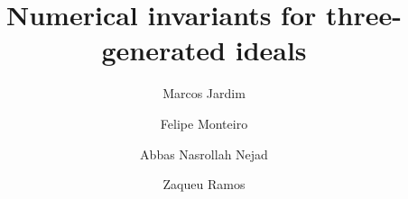 \documentclass[11pt]{amsart} %
\theoremstyle{definition}
\begin{document}
		
		\title[Numerical invariants for three-generated ideals]{Numerical invariants for three-generated ideals} 
		\author{Marcos Jardim}
		\address{Universidade Estadual de Campinas (UNICAMP) \\ Instituto de Matem\'atica, Estat\'{\i}stica e Computação Cient\'{\i}fica (IMECC) \\ Departamento de Matem\'atica \\ Rua S\'ergio Buarque de Holanda, 651\\ 13083-970 Campinas-SP, Brazil}
				\author{Felipe  Monteiro}
		\address{Universidade Estadual de Campinas (UNICAMP) \\ Instituto de Matem\'atica, Estat\'{\i}stica e Computação Cient\'{\i}fica (IMECC) \\ Departamento de Matem\'atica \\ Rua S\'ergio Buarque de Holanda, 651\\ 13083-970 Campinas-SP, Brazil}
		\author{Abbas Nasrollah Nejad}
		\address{Department of Mathematics, Institute for Advanced Studies in Basic Sciences (IASBS), Zanjan 45137-66731, Iran \newline \indent
        Instituto de Ciência e Tecnologia, Universidade Federal de S\~ao Paulo (UNIFESP),
        S\~ao Jos\'e dos Campos, SP, Brazil
        }

        \author{Zaqueu Ramos}
		\address{Universidade Federal de Sergipe\\ Centro de Ci\^encias Exatas e Tecnologias (CCET)\\ Departamento de Matem\'atica\\ Av. Marcelo Deda Chagas, s/n\\ S\~ao Crist\'v\~ao/SE - CEP 49107-230}

		
		
		
\end{document}
